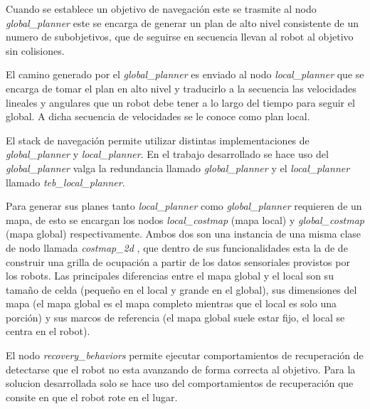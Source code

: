 Cuando se establece un objetivo de navegación este se trasmite al nodo
\emph{global\_planner} este se encarga de generar un plan de alto nivel
consistente de un numero de subobjetivos, que de seguirse en secuencia llevan
al robot al objetivo sin colisiones.

El camino generado por el \emph{global\_planner} es enviado al nodo
\emph{local\_planner} que se encarga de tomar el plan en alto nivel y
traducirlo a la secuencia las velocidades lineales y angulares que un robot
debe tener a lo largo del tiempo para seguir el global. A dicha secuencia de
velocidades se le conoce como plan local.

El stack de navegación permite utilizar distintas implementaciones de
\emph{global\_planner} y \emph{local\_planner}. En el trabajo desarrollado se
hace uso del \emph{global\_planner}\cite{ROS-global_planner} valga la
redundancia llamado \emph{global\_planner} y el \emph{local\_planner} llamado
\emph{teb\_local\_planner}\cite{ROS-teb_local_planner}.

Para generar sus planes tanto \emph{local\_planner} como \emph{global\_planner}
requieren de un mapa, de esto se encargan los nodos \emph{local\_costmap} (mapa
local) y \emph{global\_costmap} (mapa global) respectivamente. Ambos dos son
una instancia de una misma clase de nodo llamada \emph{costmap\_2d}
\cite{ROS-costmap_2d}, que dentro de sus funcionalidades esta la de de
construir una grilla de ocupación a partir de los datos sensoriales provistos
por los robots. Las principales diferencias entre el mapa global y el local son su
tamaño de celda (pequeño en el local y grande en el global), sus dimensiones
del mapa (el mapa global es el mapa completo mientras que el local es solo una
porción) y sus marcos de referencia (el mapa global suele estar fijo, el local se
centra en el robot).

El nodo \emph{recovery\_behaviors} permite ejecutar comportamientos de
recuperación de detectarse que el robot no esta avanzando de forma correcta al
objetivo. Para la solucion desarrollada solo se hace uso del comportamientos de
recuperación que consite en que el robot rote en el lugar.







